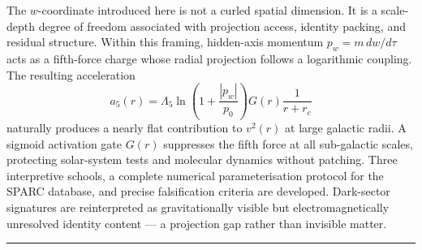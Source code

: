 \documentclass[11pt,a4paper]{article}
\newcommand{\pw}{p_w}                        %
\newcommand{\Lf}{\Lambda_5}                  %
\newcommand{\afiver}{a_5}                    %
\begin{document}
\begin{center}
\begin{minipage}{0.86\textwidth}
  The $w$-coordinate introduced here is not a curled spatial dimension.
  It is a scale-depth degree of freedom associated with projection access,
  identity packing, and residual structure.  Within this framing,
  hidden-axis momentum $\pw = m\,dw/d\tau$ acts as a fifth-force charge whose
  radial projection follows a logarithmic coupling.  The resulting acceleration
  \[
    \afiver(r) = \Lf\ln\!\left(1+\frac{|\pw|}{p_0}\right)
    G(r)\frac{1}{r+r_c}
  \]
  naturally produces a nearly flat contribution to $v^2(r)$ at large galactic
  radii.  A sigmoid activation gate $G(r)$ suppresses the fifth force at all
  sub-galactic scales, protecting solar-system tests and molecular dynamics
  without patching.  Three interpretive schools, a complete numerical
  parameterisation protocol for the SPARC database, and precise falsification
  criteria are developed.  Dark-sector signatures are reinterpreted as
  gravitationally visible but electromagnetically unresolved identity content
  --- a projection gap rather than invisible matter.
  \end{minipage}

  \vspace{0.8em}
  \noindent\rule{\textwidth}{1.2pt}
\end{center}
\end{document}
